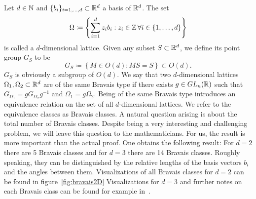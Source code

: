Let $d\in\mathbb{N}$ and $\{b_i\}_{i=1,\dots,d}\subset \mathbb{R}^d$ a basis of $\mathbb{R}^d$. The set 
\begin{equation*}
    \Omega\coloneq\left\{\sum_{i=1}^{d}z_i b_i: z_i\in\mathbb{Z}\,\forall i\in\{1,\dots,d\}\right\}
\end{equation*}
is called a $d$-dimensional lattice. Given any subset $S\subset\mathbb{R}^d$, we define its point group $G_S$ to be
\begin{equation*}
    G_S\coloneq \left\{M\in O(d) : MS=S\right\}\subset O(d).
\end{equation*}
$G_S$ is obviously a subgroup of $O(d)$. We say that two $d$-dimensional lattices $\Omega_1, \Omega_2\subset \mathbb{R}^d$ are of the same Bravais type if
there exists $g\in GL_n(\mathbb{R})$ such that $G_{\Omega_1}=g G_{\Omega_2} g^{-1}$ and $\Omega_1=g\Omega_2$. 
Being of the same Bravais type introduces an equivalence relation on the set of all $d$-dimensional lattices. We refer to the equivalence classes as Bravais classes.
A natural question arising is about the total number of Bravais classes. Despite being a very interesting and challenging problem,
we will leave this question to the mathematicians. For us, the result is more important than the actual proof. One obtains the following result:
For $d=2$ there are 5 Bravais classes and for $d=3$ there are 14 Bravais classes. 
Roughly speaking, they can be distinguished by the relative lengths of the basis vectors $b_i$ and the angles between them.
Visualizations of all Bravais classes for $d=2$ can be found in figure~\ref{fig:bravais2D}
Visualizations for $d=3$ and further notes on each Bravais class can be found for example in~\cite{kittel}.

